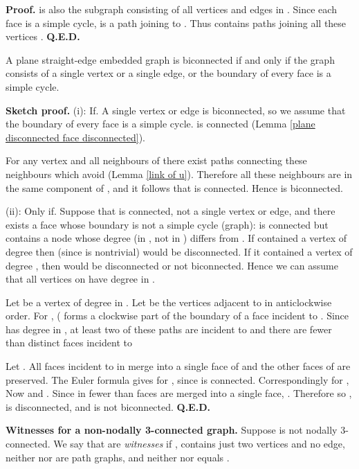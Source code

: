 {\bf Proof.}
 is also the subgraph consisting
of all vertices and edges in .
Since each face is a simple cycle, 
is a path joining  to .  Thus
 contains paths joining all these vertices
. {\bf Q.E.D.}\medskip

\begin{lemma}
\label{planar biconnected} A plane straight-edge embedded graph  is biconnected if and only if
the graph consists of a single vertex or a single edge, or
the boundary of every face is a simple cycle.
\end{lemma}

{\bf Sketch proof.}
(i): If. A single vertex or edge is biconnected, so we
assume that the boundary of every face is a simple cycle.
 is connected (Lemma
\ref{plane disconnected face disconnected}).

For any vertex  and all neighbours  of  there
exist paths connecting these neighbours which avoid 
(Lemma \ref{link of u}).  Therefore all these neighbours are
in the same component of , and it follows that
 is connected.  Hence  is biconnected.

(ii): Only if. Suppose that  is connected, not a single vertex
or edge, and there exists a face  whose
boundary is not a simple cycle (graph):
 is connected but
contains a node  whose degree (in , not in )
differs from .  If  contained a vertex  of
degree  then (since  is nontrivial)  would be disconnected.
If it contained a vertex of degree , then  would
be disconnected or not biconnected.  Hence we can assume
that all vertices on  have degree  in .

Let  be a vertex of degree  in .  Let
 be the vertices adjacent to  in anticlockwise
order.  For ,  ( forms a clockwise
part of the boundary of a face incident to .  Since  has
degree  in , at least two of these
paths are incident to  and there are fewer than 
distinct faces incident to 

Let . All faces incident to  in 
merge into a single face of  and the other faces of 
are preserved.
The Euler formula gives
 for , since  is connected.  Correspondingly
for ,
 Now  and .
Since in  fewer than  faces are merged into a single face,
. Therefore
 so ,
 is disconnected, and  is not biconnected. {\bf Q.E.D.}\medskip

\numpara
\label{witnesses} {\bf Witnesses for a non-nodally 3-connected graph.}
Suppose  is not nodally 3-connected.  We
say that  are {\em witnesses} if ,
 contains just two vertices  and no edge,
neither  nor  are path graphs, and neither  nor 
equals .

